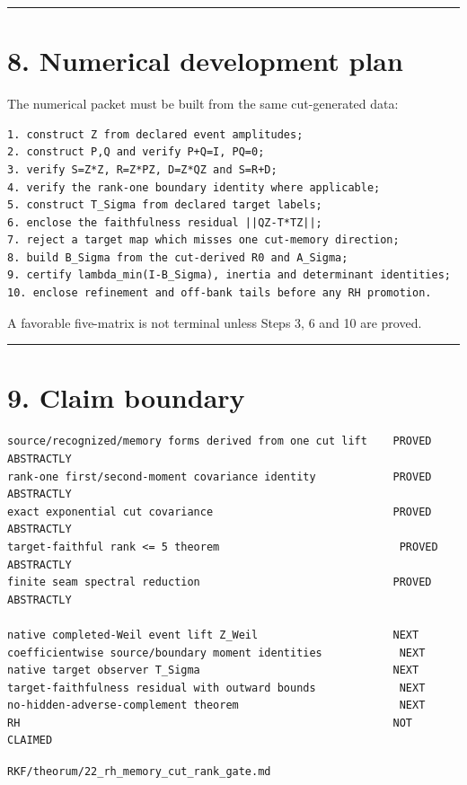 \begin{center}\rule{0.5\linewidth}{0.5pt}\end{center}

\hypertarget{numerical-development-plan}{%
\section{8. Numerical development plan}\label{numerical-development-plan}}

The numerical packet must be built from the same cut-generated data:

\begin{verbatim}
1. construct Z from declared event amplitudes;
2. construct P,Q and verify P+Q=I, PQ=0;
3. verify S=Z*Z, R=Z*PZ, D=Z*QZ and S=R+D;
4. verify the rank-one boundary identity where applicable;
5. construct T_Sigma from declared target labels;
6. enclose the faithfulness residual ||QZ-T*TZ||;
7. reject a target map which misses one cut-memory direction;
8. build B_Sigma from the cut-derived R0 and A_Sigma;
9. certify lambda_min(I-B_Sigma), inertia and determinant identities;
10. enclose refinement and off-bank tails before any RH promotion.
\end{verbatim}

A favorable five-matrix is not terminal unless Steps 3, 6 and 10 are proved.

\begin{center}\rule{0.5\linewidth}{0.5pt}\end{center}

\hypertarget{claim-boundary}{%
\section{9. Claim boundary}\label{claim-boundary}}

\begin{verbatim}
source/recognized/memory forms derived from one cut lift    PROVED ABSTRACTLY
rank-one first/second-moment covariance identity            PROVED ABSTRACTLY
exact exponential cut covariance                            PROVED ABSTRACTLY
target-faithful rank <= 5 theorem                            PROVED ABSTRACTLY
finite seam spectral reduction                              PROVED ABSTRACTLY

native completed-Weil event lift Z_Weil                     NEXT
coefficientwise source/boundary moment identities            NEXT
native target observer T_Sigma                              NEXT
target-faithfulness residual with outward bounds             NEXT
no-hidden-adverse-complement theorem                         NEXT
RH                                                          NOT CLAIMED
\end{verbatim}

\begin{flushright}\small\texttt{RKF/theorum/22\_rh\_memory\_cut\_rank\_gate.md}\end{flushright}
